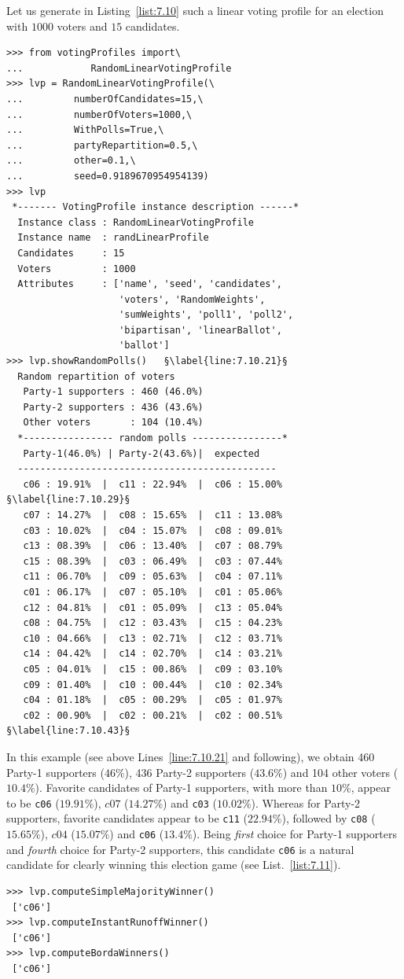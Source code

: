 Let us generate in Listing~\vref{list:7.10} such a linear voting profile for an election with $1000$ voters and $15$ candidates.
\begin{lstlisting}[caption={Generating a linear voting profile with random polls},label=list:7.10]
>>> from votingProfiles import\
...            RandomLinearVotingProfile
>>> lvp = RandomLinearVotingProfile(\
...         numberOfCandidates=15,\
...         numberOfVoters=1000,\
...         WithPolls=True,\
...         partyRepartition=0.5,\
...         other=0.1,\
...         seed=0.9189670954954139)
>>> lvp
 *------- VotingProfile instance description ------*
  Instance class : RandomLinearVotingProfile
  Instance name  : randLinearProfile
  Candidates     : 15
  Voters         : 1000
  Attributes     : ['name', 'seed', 'candidates',
                    'voters', 'RandomWeights',
                    'sumWeights', 'poll1', 'poll2',
                    'bipartisan', 'linearBallot',
                    'ballot']
>>> lvp.showRandomPolls()   §\label{line:7.10.21}§ 
  Random repartition of voters
   Party-1 supporters : 460 (46.0%)
   Party-2 supporters : 436 (43.6%)
   Other voters       : 104 (10.4%)
  *---------------- random polls ----------------*
   Party-1(46.0%) | Party-2(43.6%)|  expected  
  ----------------------------------------------
   c06 : 19.91%  |  c11 : 22.94%  |  c06 : 15.00% §\label{line:7.10.29}§
   c07 : 14.27%  |  c08 : 15.65%  |  c11 : 13.08%
   c03 : 10.02%  |  c04 : 15.07%  |  c08 : 09.01%
   c13 : 08.39%  |  c06 : 13.40%  |  c07 : 08.79%
   c15 : 08.39%  |  c03 : 06.49%  |  c03 : 07.44%
   c11 : 06.70%  |  c09 : 05.63%  |  c04 : 07.11%
   c01 : 06.17%  |  c07 : 05.10%  |  c01 : 05.06%
   c12 : 04.81%  |  c01 : 05.09%  |  c13 : 05.04%
   c08 : 04.75%  |  c12 : 03.43%  |  c15 : 04.23%
   c10 : 04.66%  |  c13 : 02.71%  |  c12 : 03.71%
   c14 : 04.42%  |  c14 : 02.70%  |  c14 : 03.21%
   c05 : 04.01%  |  c15 : 00.86%  |  c09 : 03.10%
   c09 : 01.40%  |  c10 : 00.44%  |  c10 : 02.34%
   c04 : 01.18%  |  c05 : 00.29%  |  c05 : 01.97%
   c02 : 00.90%  |  c02 : 00.21%  |  c02 : 00.51% §\label{line:7.10.43}§ 
\end{lstlisting}

In this example (see above Lines~\ref{line:7.10.21} and following), we obtain 460 Party-1 supporters ($46\%$), 436 Party-2 supporters ($43.6\%$) and 104 other voters ($10.4\%$). Favorite candidates of Party-1 supporters, with more than $10\%$, appear to be \texttt{c06} ($19.91\%$), $c07$ ($14.27\%$) and \texttt{c03} ($10.02\%$). Whereas for Party-2 supporters, favorite candidates appear to be \texttt{c11} ($22.94\%$), followed by \texttt{c08} ($15.65\%$), $c04$ ($15.07\%$) and \texttt{c06} ($13.4\%$). Being \emph{first} choice for Party-1 supporters and \emph{fourth} choice for Party-2 supporters, this candidate \texttt{c06} is a natural candidate for clearly winning this election game (see List.~\vref{list:7.11}).
\begin{lstlisting}[caption={The uninominal and \Borda election winner},label=list:7.11]
>>> lvp.computeSimpleMajorityWinner()
 ['c06']
>>> lvp.computeInstantRunoffWinner()
 ['c06']  
>>> lvp.computeBordaWinners()
 ['c06']
\end{lstlisting}

